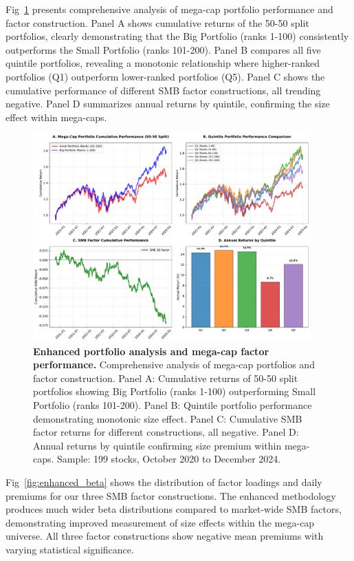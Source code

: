 \documentclass[10pt,letterpaper]{article}
\begin{document}
Fig~\ref{fig:enhanced_portfolio} presents comprehensive analysis of mega-cap portfolio performance and factor construction. Panel A shows cumulative returns of the 50-50 split portfolios, clearly demonstrating that the Big Portfolio (ranks 1-100) consistently outperforms the Small Portfolio (ranks 101-200). Panel B compares all five quintile portfolios, revealing a monotonic relationship where higher-ranked portfolios (Q1) outperform lower-ranked portfolios (Q5). Panel C shows the cumulative performance of different SMB factor constructions, all trending negative. Panel D summarizes annual returns by quintile, confirming the size effect within mega-caps.

\begin{figure}[!h]
\centering
\includegraphics[width=0.95\textwidth]{figures/fig_enhanced_portfolio_analysis.pdf}
\caption{\textbf{Enhanced portfolio analysis and mega-cap factor performance.}
Comprehensive analysis of mega-cap portfolios and factor construction. Panel A: Cumulative returns of 50-50 split portfolios showing Big Portfolio (ranks 1-100) outperforming Small Portfolio (ranks 101-200). Panel B: Quintile portfolio performance demonstrating monotonic size effect. Panel C: Cumulative SMB factor returns for different constructions, all negative. Panel D: Annual returns by quintile confirming size premium within mega-caps. Sample: 199 stocks, October 2020 to December 2024.}
\label{fig:enhanced_portfolio}
\end{figure}

Fig~\ref{fig:enhanced_beta} shows the distribution of factor loadings and daily premiums for our three SMB factor constructions. The enhanced methodology produces much wider beta distributions compared to market-wide SMB factors, demonstrating improved measurement of size effects within the mega-cap universe. All three factor constructions show negative mean premiums with varying statistical significance.
\end{document}

